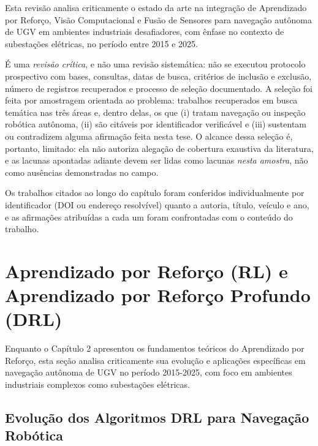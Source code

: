 Esta revisão analisa criticamente o estado da arte na integração de Aprendizado por Reforço, Visão Computacional e Fusão de Sensores para navegação autônoma de \ac{UGV} em ambientes industriais desafiadores, com ênfase no contexto de subestações elétricas, no período entre 2015 e 2025.

É uma \emph{revisão crítica}, e não uma revisão sistemática: não se executou protocolo prospectivo com bases, consultas, datas de busca, critérios de inclusão e exclusão, número de registros recuperados e processo de seleção documentado. A seleção foi feita por amostragem orientada ao problema: trabalhos recuperados em busca temática nas três áreas e, dentro delas, os que (i) tratam navegação ou inspeção robótica autônoma, (ii) são citáveis por identificador verificável e (iii) sustentam ou contradizem alguma afirmação feita nesta tese. O alcance dessa seleção é, portanto, limitado: ela não autoriza alegação de cobertura exaustiva da literatura, e as lacunas apontadas adiante devem ser lidas como lacunas \emph{nesta amostra}, não como ausências demonstradas no campo.

Os trabalhos citados ao longo do capítulo foram conferidos individualmente por identificador (DOI ou endereço resolvível) quanto a autoria, título, veículo e ano, e as afirmações atribuídas a cada um foram confrontadas com o conteúdo do trabalho.

\section{Aprendizado por Reforço (RL) e Aprendizado por Reforço Profundo (DRL)}

Enquanto o Capítulo 2 apresentou os fundamentos teóricos do Aprendizado por Reforço, esta seção analisa criticamente sua evolução e aplicações específicas em navegação autônoma de \ac{UGV} no período 2015-2025, com foco em ambientes industriais complexos como subestações elétricas.

\subsection{Evolução dos Algoritmos DRL para Navegação Robótica}

